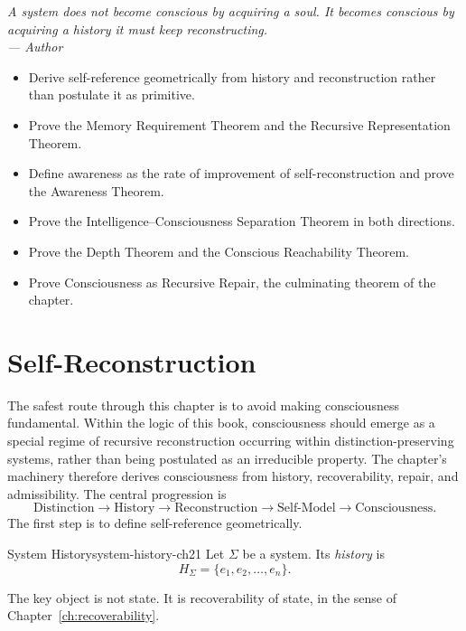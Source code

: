 \documentclass[12pt,twoside,openright]{book}
\newenvironment{epigraph}[2]{%
  \vspace{1em}\begin{flushright}
  \begin{minipage}{0.72\textwidth}
  \itshape\small #1\\[0.4em]
  \upshape\footnotesize\sffamily\color{DistGray}--- #2
  \end{minipage}\end{flushright}\vspace{1.5em}}{}
\newenvironment{objectives}{%
  \begin{tcolorbox}[colback=DistBlue!5,colframe=DistBlue,
    title={\faCheckCircle\enspace Learning Objectives},
    fonttitle=\sffamily\bfseries\color{white},
    attach boxed title to top left={yshift=-2mm,xshift=4mm},
    boxed title style={colback=DistBlue},breakable]
  \begin{itemize}[leftmargin=*,nosep]}{%
  \end{itemize}\end{tcolorbox}\vspace{1em}}
\begin{document}
\begin{epigraph}{%
  A system does not become conscious by acquiring a soul.
  It becomes conscious by acquiring a history it must
  keep reconstructing.}%
  {Author}
\end{epigraph}

\begin{objectives}
  \item Derive self-reference geometrically from history
        and reconstruction rather than postulate it as
        primitive.
  \item Prove the Memory Requirement Theorem and the
        Recursive Representation Theorem.
  \item Define awareness as the rate of improvement of
        self-reconstruction and prove the Awareness Theorem.
  \item Prove the Intelligence--Consciousness Separation
        Theorem in both directions.
  \item Prove the Depth Theorem and the Conscious
        Reachability Theorem.
  \item Prove Consciousness as Recursive Repair, the
        culminating theorem of the chapter.
\end{objectives}

\section{Self-Reconstruction}
\label{sec:ch21-self-reconstruction}

The safest route through this chapter is to avoid making
consciousness fundamental. Within the logic of this book,
consciousness should emerge as a special regime of
recursive reconstruction occurring within
distinction-preserving systems, rather than being
postulated as an irreducible property. The chapter's
machinery therefore derives consciousness from history,
recoverability, repair, and admissibility. The central
progression is
\[
  \text{Distinction} \to \text{History} \to \text{Reconstruction}
  \to \text{Self-Model} \to \text{Consciousness}.
\]
The first step is to define self-reference geometrically.

\begin{definition}{System History}{system-history-ch21}
  Let $\Sigma$ be a system. Its \emph{history} is
  \[
    H_\Sigma = \{e_1, e_2, \ldots, e_n\}.
  \]
\end{definition}

The key object is not state. It is recoverability of state,
in the sense of Chapter~\ref{ch:recoverability}.
\end{document}
